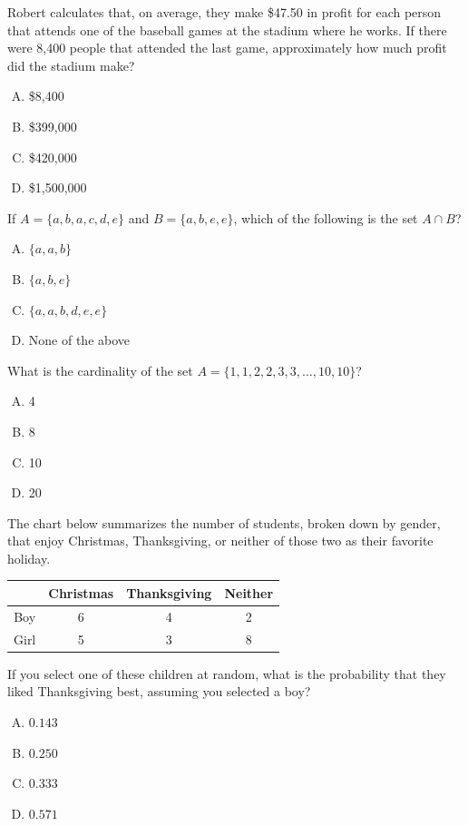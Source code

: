 \documentclass[12pt,letterpaper]{exam}
\begin{document}
\begin{questions}
\vfill

\question Robert calculates that, on average, they make \$47.50 in profit for each person that attends one of the baseball games at the stadium where he works. If there were 8,400 people that attended the last game, approximately how much profit did the stadium make?
	\begin{enumerate}[A.]
	\item \$8,400
	\item \$399,000
	\item \$420,000
	\item \$1,500,000
	\end{enumerate}

\vfill

\question If $A= \{ a, b, a, c, d, e \}$ and $B= \{ a, b, e, e \}$, which of the following is the set $A \cap B$?
	\begin{enumerate}[A.]
	\item $\{ a, a, b \}$
	\item $\{ a, b, e \}$
	\item $\{ a, a, b, d, e, e \}$
	\item None of the above
	\end{enumerate}

\vfill

\question What is the cardinality of the set $A= \{ 1, 1, 2, 2, 3, 3, \ldots, 10, 10 \}$?
	\begin{enumerate}[A.]
	\item 4
	\item 8
	\item 10
	\item 20
	\end{enumerate}

\vfill

\question The chart below summarizes the number of students, broken down by gender, that enjoy Christmas, Thanksgiving, or neither of those two as their favorite holiday. \par
	\begin{table}[H]
	\centering
	\begin{tabular}{|c|c|c|c|} \hline
	& Christmas & Thanksgiving & Neither \\ \hline
	Boy & 6 & 4 & 2 \\ \hline
	Girl & 5 & 3 & 8 \\ \hline
	\end{tabular}
	\end{table} \par
If you select one of these children at random, what is the probability that they liked Thanksgiving best, assuming you selected a boy?
	\begin{enumerate}[A.]
	\item $0.143$
	\item $0.250$
	\item $0.333$
	\item $0.571$
	\end{enumerate}


\end{questions}
\end{document}

